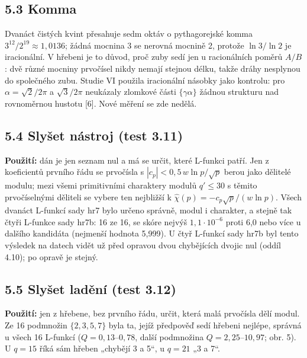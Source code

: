 \documentclass[
  10pt,
]{article}
\begin{document}
\hypertarget{komma}{%
\subsection{5.3 Komma}\label{komma}}

Dvanáct čistých kvint přesahuje sedm oktáv o pythagorejské komma
\(3^{12}/2^{19} \approx 1{,}0136\); žádná mocnina 3 se nerovná mocnině
2, protože \(\ln 3/\ln 2\) je iracionální. V hřebeni je to důvod, proč
zuby sedí jen u racionálních poměrů \(A/B\): dvě různé mocniny prvočísel
nikdy nemají stejnou délku, takže dráhy nesplynou do společného zubu.
Studie VI použila iracionální násobky jako kontrolu: pro
\(\alpha = \sqrt2/2\pi\) a \(\sqrt3/2\pi\) neukázaly zlomkové části
\(\{\gamma\alpha\}\) žádnou strukturu nad rovnoměrnou hustotu {[}6{]}.
Nové měření se zde nedělá.

\hypertarget{slyux161et-nuxe1stroj-test-3.11}{%
\subsection{5.4 Slyšet nástroj (test
3.11)}\label{slyux161et-nuxe1stroj-test-3.11}}

\textbf{Použití:} dán je jen seznam nul a má se určit, které L-funkci
patří. Jen z koeficientů prvního řádu se prvočísla s
\(|c_p| < 0{,}5\,w\ln p/\sqrt p\) berou jako dělitelé modulu; mezi všemi
primitivními charaktery modulů \(q' \le 30\) s těmito prvočíselnými
děliteli se vybere ten nejbližší k
\(\hat\chi(p) = -c_p\sqrt p/(w\ln p)\). Všech dvanáct L-funkcí sady hr7
bylo určeno správně, modul i charakter, a stejně tak čtyři L-funkce sady
hr7b: 16 ze 16, se skóre nejvýš \(1{,}1\cdot10^{-6}\) proti 6,0 nebo
více u dalšího kandidáta (nejmenší hodnota 5,999). U čtyř L-funkcí sady
hr7b byl tento výsledek na datech vidět už před opravou dvou chybějících
dvojic nul (oddíl 4.10); po opravě je stejný.

\hypertarget{slyux161et-ladux11bnuxed-test-3.12}{%
\subsection{5.5 Slyšet ladění (test
3.12)}\label{slyux161et-ladux11bnuxed-test-3.12}}

\textbf{Použití:} jen z hřebene, bez prvního řádu, určit, která malá
prvočísla dělí modul. Ze 16 podmnožin \(\{2, 3, 5, 7\}\) byla ta, jejíž
předpověď sedí hřebeni nejlépe, správná u všech 16 L-funkcí
(\(Q = 0{,}13\)--\(0{,}78\), další podmnožina
\(Q = 2{,}25\)--\(10{,}97\); obr. 5). U \(q = 15\) říká sám hřeben
„chybějí 3 a 5``, u \(q = 21\) „3 a 7``.
\end{document}

